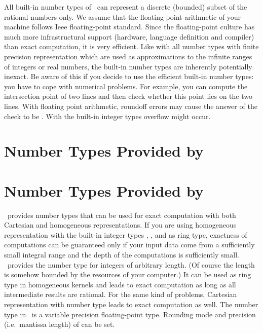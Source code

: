 All built-in number types of \CC\ can represent a discrete (bounded)
subset of the rational numbers only.  We assume that the
floating-point arithmetic of your machine follows {\sc Ieee}
floating-point standard.  Since the floating-point culture has much
more infrastructural support (hardware, language definition and
compiler) than exact computation, it is very efficient.
Like with all number types with finite precision representation
which are used as approximations to the infinite ranges of 
integers or real numbers, the built-in number types are inherently
potentially inexact.
Be aware of this if you decide to use the efficient built-in 
number types: you have to cope with numerical problems.  
For example, you can compute the intersection point of two lines and 
then check whether this point lies on the two lines. 
With floating point arithmetic,
roundoff errors may cause the answer of the check to be . 
With the built-in integer types overflow might occur.

\section{Number Types Provided by \cgal}













\section{Number Types Provided by \leda}
\label{leda-nt}

\leda\ provides number types that can be used for exact computation 
with both Cartesian and homogeneous representations.  If you are using
homogeneous representation with the built-in integer types
, , and  as ring type, exactness of
computations can be guaranteed only if your input data come from a
sufficiently small integral range and the depth of the computations is
sufficiently small.  \leda\ provides the number type  for
integers of arbitrary length. (Of course the length is
somehow bounded by the resources of your computer.)  It can be used as
ring type in homogeneous kernels and leads to exact
computation as long as all intermediate results are rational.  For the
same kind of problems, Cartesian representation with number type
 leads to exact computation as well.
The number type  in \leda\ is a variable precision
floating-point type. Rounding mode and precision (i.e.\ mantissa length) of
 can be set. 


